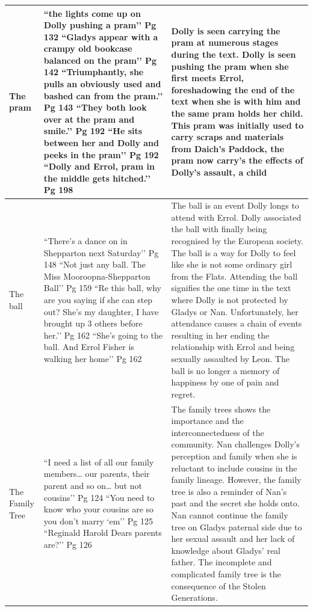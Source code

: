 \documentclass[a4paper]{article}
\begin{document}
\begin{longtable}{|p{2cm}|p{4cm}|p{7cm}|}
The pram &
``the lights come up on Dolly pushing a pram’’ Pg 132 \newline
``Gladys appear with a crampy old bookcase balanced on the pram’’ Pg 142 \newline
``Triumphantly, she pulls an obviously used and bashed can from the pram.’’ Pg 143 \newline
``They both look over at the pram and smile.’’ Pg 192 \newline
``He sits between her and Dolly and peeks in the pram’’ Pg 192 \newline
``Dolly and Errol, pram in the middle gets hitched.’’ Pg 198 &
Dolly is seen carrying the pram at numerous stages during the text. Dolly is seen pushing the pram when she first meets Errol, foreshadowing the end of the text when she is with him and the same pram holds her child. This pram was initially used to carry scraps and materials from Daich’s Paddock, the pram now carry’s the effects of Dolly’s assault, a child \\
\hline

The ball &
``There’s a dance on in Shepparton next Saturday’’ Pg 148 \newline
``Not just any ball. The Miss Mooroopna-Shepparton Ball’’ Pg 159 \newline
``Re this ball, why are you saying if she can step out? She’s my daughter, I have brought up 3 others before her.’’ Pg 162 \newline
``She’s going to the ball. And Errol Fisher is walking her home’’ Pg 162 &
The ball is an event Dolly longs to attend with Errol. Dolly associated the ball with finally being recognised by the European society. The ball is a way for Dolly to feel like she is not some ordinary girl from the Flats. Attending the ball signifies the one time in the text where Dolly is not protected by Gladys or Nan. Unfortunately, her attendance causes a chain of events resulting in her ending the relationship with Errol and being sexually assaulted by Leon. The ball is no longer a memory of happiness by one of pain and regret. \\
\hline

The Family Tree &
``I need a list of all our family members… our parents, their parent and so on… but not cousins’’ Pg 124 \newline
``You need to know who your cousins are so you don’t marry ‘em’’ Pg 125 \newline
``Reginald Harold Dears parents are?’’ Pg 126 &
The family trees shows the importance and the interconnectedness of the community. Nan challenges Dolly’s perception and family when she is reluctant to include cousins in the family lineage. However, the family tree is also a reminder of Nan’s past and the secret she holds onto. Nan cannot continue the family tree on Gladys paternal side due to her sexual assault and her lack of knowledge about Gladys’ real father. The incomplete and complicated family tree is the consequence of the Stolen Generations. \\
\hline


\end{longtable}
\end{document}
